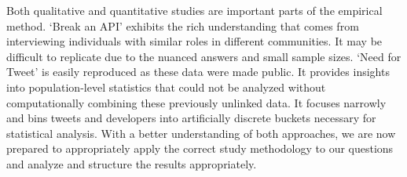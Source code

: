 \documentclass[conference]{IEEEtran}
\begin{document}
Both qualitative and quantitative studies are important parts of the empirical method. `Break an API' exhibits the rich understanding that comes from interviewing individuals with similar roles in different communities. It may be difficult to replicate due to the nuanced answers and small sample sizes. `Need for Tweet' is easily reproduced as these data were made public. It provides insights into population-level statistics that could not be analyzed without computationally combining these previously unlinked data. It focuses narrowly and bins tweets and developers into artificially discrete buckets necessary for statistical analysis. With a better understanding of both approaches, we are now prepared to appropriately apply the correct study methodology to our questions and analyze and structure the results appropriately.



\end{document}

